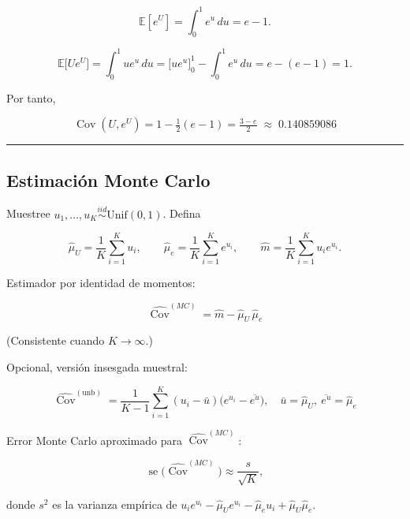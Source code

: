 \documentclass[11pt]{article}
\begin{document}
\[
\mathbb{E}[e^{U}]=\int_{0}^{1}e^{u}\,du=e-1.
\]

\[
\mathbb{E}\!\big[U e^{U}\big]=\int_{0}^{1}u e^{u}\,du
=\big[ue^{u}\big]_{0}^{1}-\int_{0}^{1}e^{u}\,du
=e-(e-1)=1.
\]

Por tanto,

\[
\boxed{\;\operatorname{Cov}(U,e^{U})=1-\tfrac12(e-1)=\tfrac{3-e}{2}\;\approx\;0.140859086\;}
\]

\begin{center}\rule{0.5\linewidth}{0.5pt}\end{center}

\hypertarget{estimaciuxf3n-monte-carlo}{%
\subsection{Estimación Monte Carlo}\label{estimaciuxf3n-monte-carlo}}

Muestree \(u_1,\dots,u_K\stackrel{iid}{\sim}\mathrm{Unif}(0,1)\). Defina

\[
\widehat{\mu}_U=\frac{1}{K}\sum_{i=1}^{K} u_i,\qquad
\widehat{\mu}_{e}=\frac{1}{K}\sum_{i=1}^{K} e^{u_i},\qquad
\widehat{m}=\frac{1}{K}\sum_{i=1}^{K} u_i e^{u_i}.
\]

Estimador por identidad de momentos:

\[
\boxed{\;\widehat{\operatorname{Cov}}^{(MC)}=\widehat{m}-\widehat{\mu}_U\,\widehat{\mu}_{e}\;}
\]

(Consistente cuando \(K\to\infty\).)

Opcional, versión insesgada muestral:

\[
\boxed{\;\widehat{\operatorname{Cov}}^{(\text{unb})}
=\frac{1}{K-1}\sum_{i=1}^{K}(u_i-\bar u)\big(e^{u_i}-\overline{e^{u}}\big),\quad
\bar u=\widehat{\mu}_U,\ \overline{e^{u}}=\widehat{\mu}_{e}\;}
\]

Error Monte Carlo aproximado para
\(\widehat{\operatorname{Cov}}^{(MC)}\):

\[
\operatorname{se}\big(\widehat{\operatorname{Cov}}^{(MC)}\big)\approx
\frac{s}{\sqrt{K}},
\]

donde \(s^2\) es la varianza empírica de
\(u_i e^{u_i}-\widehat{\mu}_U e^{u_i}-\widehat{\mu}_{e} u_i+\widehat{\mu}_U\widehat{\mu}_{e}\).
\end{document}
